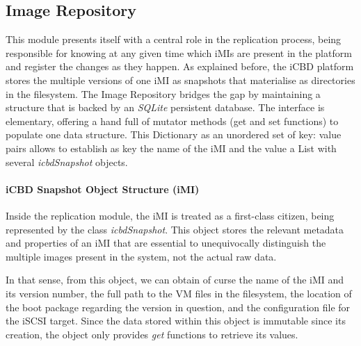 \subsection{Image Repository}
\label{sub:rep_image_repo}

This module presents itself with a central role in the replication process, being responsible for knowing at any given time which iMIs are present in the platform and register the changes as they happen.
As explained before, the iCBD platform stores the multiple versions of one iMI as snapshots that materialise as directories in the filesystem. The Image Repository bridges the gap by maintaining a structure that is backed by an \textit{SQLite} persistent database. The interface is elementary, offering a hand full of mutator methods (get and set functions) to populate one data structure. This Dictionary as an unordered set of key: value pairs allows to establish as key the name of the iMI and the value a List with several \textit{icbdSnapshot} objects. 

\paragraph{iCBD Snapshot Object Structure (iMI)}
\label{par:icbd_snapshot}

Inside the replication module, the iMI is treated as a first-class citizen, being represented by the class \textit{icbdSnapshot}. This object stores the relevant metadata and properties of an iMI that are essential to unequivocally distinguish the multiple images present in the system, not the actual raw data.

In that sense, from this object, we can obtain of curse the name of the iMI and its version number, the full path to the VM files in the filesystem, the location of the boot package regarding the version in question, and the configuration file for the iSCSI target. Since the data stored within this object is immutable since its creation, the object only provides \textit{get} functions to retrieve its values. 

